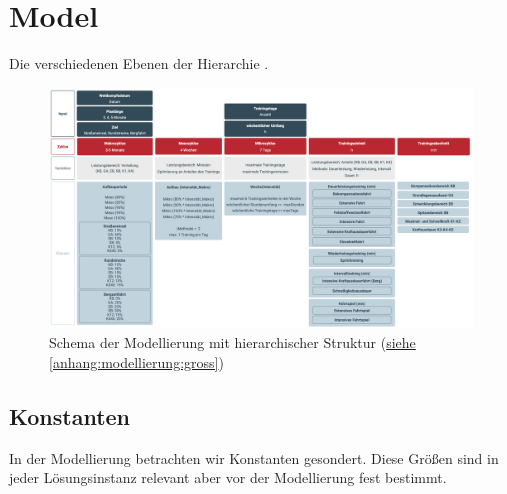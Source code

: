 \section{Model}
\label{sec:modellierung:model}
Die verschiedenen Ebenen der Hierarchie . 
\begin{figure}[h]
    \includegraphics[width=\textwidth,height=\textheight, keepaspectratio]{gfx/modellierung.png}
    \caption{Schema der Modellierung mit hierarchischer Struktur (\hyperref[anhang:modellierung:gross]{siehe \ref{anhang:modellierung:gross}})}
    \label{abbildung:modellierung:schema}
\end{figure}


\subsection{Konstanten}
In der Modellierung betrachten wir Konstanten gesondert. Diese Größen sind in jeder Lösungsinstanz relevant aber vor der Modellierung fest bestimmt.

